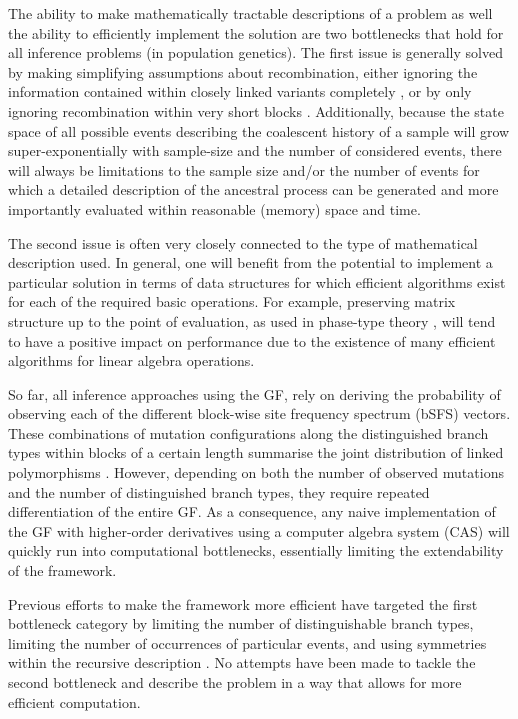 \documentclass[10pt, a4]{article}
\begin{document}
The ability to make mathematically tractable descriptions of a problem as well the ability to efficiently implement the solution are two bottlenecks that hold for all inference problems (in population genetics). The first issue is generally solved by making simplifying assumptions about recombination, either ignoring the information contained within closely linked variants completely \citep{Gutenkunst2009, Excoffier2013}, or by only ignoring recombination within very short blocks \citep{Yang2002, Hey2004, Lohse2011}. Additionally, because the state space of all possible events describing the coalescent history of a sample will grow super-exponentially with sample-size and the number of considered events, there will always be limitations to the sample size and/or the number of events for which a detailed description of the ancestral process can be generated and more importantly evaluated within reasonable (memory) space and time.

The second issue is often very closely connected to the type of mathematical description used. In general, one will benefit from the potential to implement a particular solution in terms of data structures for which efficient algorithms exist for each of the required basic operations. For example, preserving matrix structure up to the point of evaluation, as used in phase-type theory \citep{Hobolth2019}, will tend to have a positive impact on performance due to the existence of many efficient algorithms for linear algebra operations.

So far, all inference approaches using the GF, rely on deriving the probability of observing each of the different block-wise site frequency spectrum (bSFS) vectors. These combinations of mutation configurations along the distinguished branch types within blocks of a certain length summarise the joint distribution of linked polymorphisms \citep{Bunnefeld2015}. However, depending on both the number of observed mutations and the number of distinguished branch types, they require repeated differentiation of the entire GF. As a consequence, any naive implementation of the GF with higher-order derivatives using a computer algebra system (CAS) will quickly run into computational bottlenecks, essentially limiting the extendability of the framework.

Previous efforts to make the framework more efficient have targeted the first bottleneck category by limiting the number of distinguishable branch types, limiting the number of occurrences of particular events, and using symmetries within the recursive description \citep{Lohse2016}. No attempts have been made to tackle the second bottleneck and describe the problem in a way that allows for more efficient computation.\\
\end{document}
